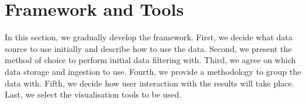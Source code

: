 \section{Framework and Tools}
In this section, we gradually develop the framework. First, we decide what data source to use initially and describe how to use the data. Second, we present the method of choice to perform initial data filtering with. Third, we agree on which data storage and ingestion to use. Fourth, we provide a methodology to group the data with. Fifth, we decide how user interaction with the results will take place. Last, we select the visualisation tools to be used.






